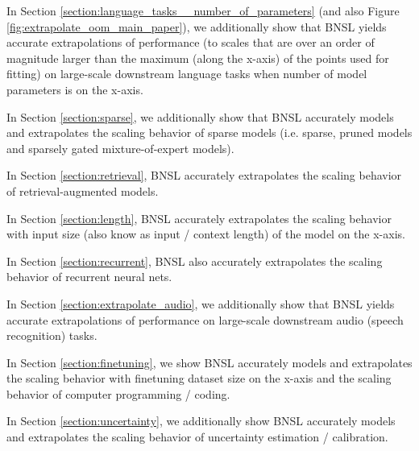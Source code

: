 \documentclass{article} %
\begin{document}

In Section \ref{section:language_tasks__number_of_parameters} (and also Figure \ref{fig:extrapolate_oom_main_paper}), we additionally show that BNSL yields accurate extrapolations of performance (to scales that are over an order of magnitude larger than the maximum (along the x-axis) of the points used for fitting) on large-scale downstream language tasks when number of model parameters is on the x-axis.

\vspace{-2.1mm}

In Section \ref{section:sparse}, we additionally show that BNSL accurately models and extrapolates the scaling behavior of sparse models (i.e. sparse, pruned models and sparsely gated mixture-of-expert models).

\vspace{-2.1mm}

In Section \ref{section:retrieval}, BNSL accurately extrapolates the scaling behavior of retrieval-augmented models.

\vspace{-2.1mm}

In Section \ref{section:length}, BNSL accurately extrapolates the scaling behavior with input size (also know as input / context length) of the model on the x-axis.

\vspace{-2.1mm}

In Section \ref{section:recurrent}, BNSL also accurately extrapolates the scaling behavior of recurrent neural nets.

\vspace{-2.1mm}

In Section \ref{section:extrapolate_audio}, we additionally show that BNSL yields accurate extrapolations of performance on large-scale downstream audio (speech recognition) tasks.

\vspace{-2.1mm}

In Section \ref{section:finetuning}, we show BNSL accurately models and extrapolates the scaling behavior with finetuning dataset size on the x-axis and the scaling behavior of computer programming / coding.

\vspace{-2.1mm}

In Section \ref{section:uncertainty}, we additionally show BNSL accurately models and extrapolates the scaling behavior of uncertainty estimation / calibration.
\end{document}
